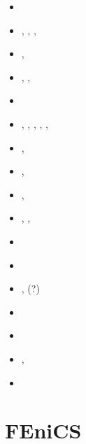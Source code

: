 \begin{small}
\begin{itemize}
\item[\twothousandone]       \textcite{modm01}
\item[\twothousandthree]     \textcite{modm03},  \textcite{wibm03}
                             \textcite{mumc03},  \textcite{wemv03}
                             \textcite{onmo03},  \textcite{onml03}
\item[\twothousandfour]      \textcite{wijns2004}, \textcite{wesm04}
\item[\twothousandfive]      \textcite{wiwg05},  \textcite{onml05},  \textcite{onmj05}
\item[\twothousandsix]       \textcite{onmm06} 
\item[\twothousandseven]     \textcite{moql07},  \textcite{gewm07}, \textcite{onjl07},
                             \textcite{dyrm07},  \textcite{onlm07}, \textcite{onlj07}
\item[\twothousandeight]     \textcite{onlg08},  \textcite{clsm08}
\item[\twothousandnine]      \textcite{onlj09},  \textcite{retw09}
\item[\twothousandten]       \textcite{pyeg10},  \textcite{onni10}
\item[\twothousandeleven]    \textcite{legu11},  \textcite{retk11}, \textcite{salo11}
\item[\twothousandtwelve]    \textcite{lega12}
\item[\twothousandthirteen]  \textcite{onlh13}
\item[\twothousandfourteen]  \textcite{recf14}, \textcite{capi14}(?)
\item[\twothousandfifteen]   \textcite{onlc15}
\item[\twothousandtwentyone] \textcite{zhle21}
\item[\twothousandtwentythree] \textcite{zhll23}, \textcite{zhlc23}
\item[\twothousandtwentyfour] \textcite{recf24}
\end{itemize}
\end{small}


\section{FEniCS} 

